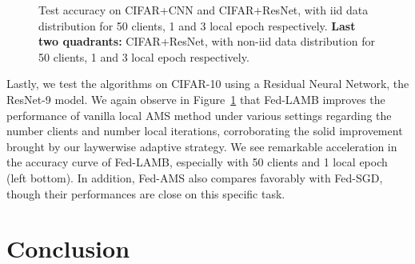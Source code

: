 \documentclass[11pt]{article}
\begin{document}
\begin{figure}[t]
\begin{center}
{        }
    \end{center}
	\caption{Test accuracy on CIFAR+CNN and CIFAR+ResNet, with iid data distribution for 50 clients, 1 and 3 local epoch respectively. \textbf{Last two quadrants:} CIFAR+ResNet, with non-iid data distribution for 50 clients, 1 and 3 local epoch respectively.}
	\label{fig:cifar-cnn-iid}
\end{figure}



Lastly, we test the algorithms on CIFAR-10 using a Residual Neural Network, the ResNet-9 model. 
We again observe in Figure~\ref{fig:cifar-cnn-iid} that Fed-LAMB improves the performance of vanilla local AMS method under various settings regarding the number clients and number local iterations, corroborating the solid improvement brought by our laywerwise adaptive strategy. We see remarkable acceleration in the accuracy curve of Fed-LAMB, especially with 50 clients and 1 local epoch (left bottom). In addition, Fed-AMS also compares favorably with Fed-SGD, though their performances are close on this specific task. 




\section{Conclusion}\label{sec:conclusion}
\end{document}

